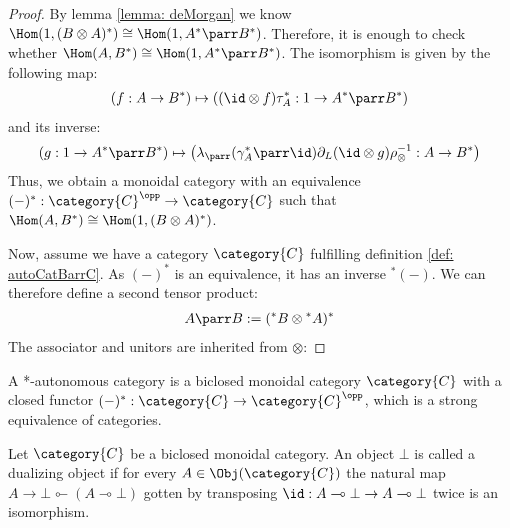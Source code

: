 \documentclass[DIN, pagenumber=false, fontsize=11pt, parskip=half, colorinlistoftodos, svgnames]{scrartcl}
\begin{document}
\begin{proof}
		By lemma \ref{lemma: deMorgan} we know 
		$\Hom(1, (B \otimes A)^* ) \cong \Hom(1, A^* \parr B^*) $. 
		Therefore, it is enough to check whether 
		$\Hom(A, B^*) \cong \Hom(1, A^* \parr B^*) $.
		The isomorphism is given by the following map:
		\begin{align*}
			(f: A\rightarrow B^*) 
			\mapsto 
			\left((\id \otimes f)\tau^*_A : 1 \rightarrow A^* \parr B^* \right)
		\end{align*} 
		and its inverse:
		\begin{align*}
			(g: 1\rightarrow A^* \parr B^*) 
			\mapsto 
			\left(\lambda_\parr(\gamma_A^*  \parr \id) \partial_L (\id \otimes g) \rho_\otimes^{-1} : A \rightarrow B^* \right)
		\end{align*}
		Thus, we obtain a monoidal category with an equivalence 
		$(-)^*:\category{C}^\opp \rightarrow \category{C} $ 
		such that 
		$\Hom(A, B^*) \cong \Hom(1, (B \otimes A)^* )$.
		
		Now, assume we have a category $\category{C}$ fulfilling definition \ref{def: autoCatBarrC}. As $(-)^*$ is an equivalence, it has an inverse ${^*(-)}$.
		We can therefore define a second tensor product: 
		\begin{align*}
			A \parr B := ({^*B} \otimes {^*A})^*
		\end{align*} 
		The associator and unitors are inherited from $\otimes$:
		
	\end{proof}
	
	
	\iffalse
	\begin{definition}
		\label{def: autoCatBarrA}
		A *-autonomous category is a biclosed monoidal category $\category{C} $ with a closed functor $(-)^*: \category{C} \rightarrow \category{C}^\opp $, which is a strong equivalence of categories.     
	\end{definition}
	
	\begin{definition}
		\label{def: dualizingObj}
		Let $\category{C} $ be a biclosed monoidal category. 
		An object $\bot $ is called a dualizing object if for every $A \in \Obj(\category{C}) $ the natural map $A \rightarrow \bot \multimapinv (A \multimap \bot) $ gotten by transposing $\id: A \multimap \bot \rightarrow A\multimap \bot $ twice is an isomorphism. 
	\end{definition}
	
\end{document}
